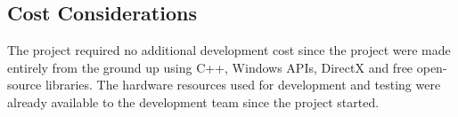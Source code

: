 \subsection{Cost Considerations}
\label{subsec:cost-considerations}

The project required no additional development cost since the project were made entirely from the ground up
using C++, Windows APIs, DirectX and free open-source libraries.
The hardware resources used for development and testing were already available to the development team since the project started.

